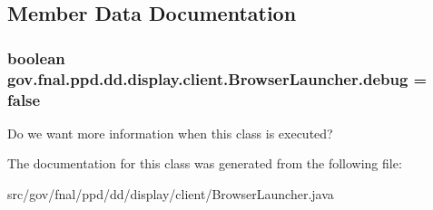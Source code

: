 \subsection{Member Data Documentation}
\hypertarget{classgov_1_1fnal_1_1ppd_1_1dd_1_1display_1_1client_1_1BrowserLauncher_a1e0101712e66f938f905b9b17baf101d}{
\subsubsection[{debug}]{\setlength{\rightskip}{0pt plus 5cm}boolean gov.\-fnal.\-ppd.\-dd.\-display.\-client.\-Browser\-Launcher.\-debug = false\hspace{0.3cm}{\ttfamily [static]}}}\label{classgov_1_1fnal_1_1ppd_1_1dd_1_1display_1_1client_1_1BrowserLauncher_a1e0101712e66f938f905b9b17baf101d}
Do we want more information when this class is executed? 

The documentation for this class was generated from the following file\-:\begin{DoxyCompactItemize}
\item 
src/gov/fnal/ppd/dd/display/client/Browser\-Launcher.\-java\end{DoxyCompactItemize}
